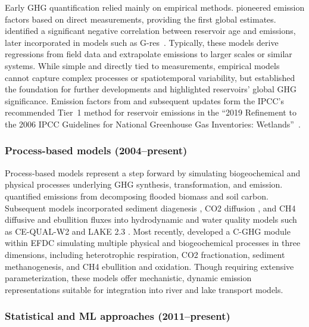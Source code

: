 \documentclass[10pt]{article}
\begin{document}
Early \ac{GHG} quantification relied mainly on empirical methods. 
\citet{Louis2000} pioneered emission factors based on direct measurements, providing the first global estimates. 
\citet{Barros2011} identified a significant negative correlation between reservoir age and emissions, later incorporated in models such as G-res~\cite{Prairie2017b, Prairie2021}. 
Typically, these models derive regressions from field data and extrapolate emissions to larger scales or similar systems. 
While simple and directly tied to measurements, empirical models cannot capture complex processes or spatiotemporal variability, but established the foundation for further developments and highlighted reservoirs’ global \ac{GHG} significance. 
Emission factors from \citet{Louis2000} and subsequent updates form the IPCC's recommended Tier~1 method for reservoir emissions in the ``2019 Refinement to the 2006 \acs{IPCC} Guidelines for National Greenhouse Gas Inventories: Wetlands''~\cite{IPCC2019}.

\subsubsection{Process-based models (2004--present)}
\label{sec:process_models}

Process-based models represent a step forward by simulating biogeochemical and physical processes underlying \ac{GHG} synthesis, transformation, and emission. 
\citet{Tremblay2004} quantified emissions from decomposing flooded biomass and soil carbon. 
Subsequent models incorporated sediment diagenesis \cite{Berger2014}, \ac{CO2} diffusion \cite{Wu2022}, and \ac{CH4} diffusive and ebullition fluxes \citep{Lomov2024} into hydrodynamic and water quality models such as CE-QUAL-W2 \citep{Berger2014, Wu2022} and LAKE 2.3 \citep{Lomov2024}. 
Most recently, \citet{SHI2025} developed a C-GHG module within \ac{EFDC} \cite{hamrick1992} simulating multiple physical and biogeochemical processes in three dimensions, including heterotrophic respiration, \ac{CO2} fractionation, sediment methanogenesis, and \ac{CH4} ebullition and oxidation. 
Though requiring extensive parameterization, these models offer mechanistic, dynamic emission representations suitable for integration into river and lake transport models.

\subsubsection{Statistical and \ac{ML} approaches (2011--present)}
\end{document}
